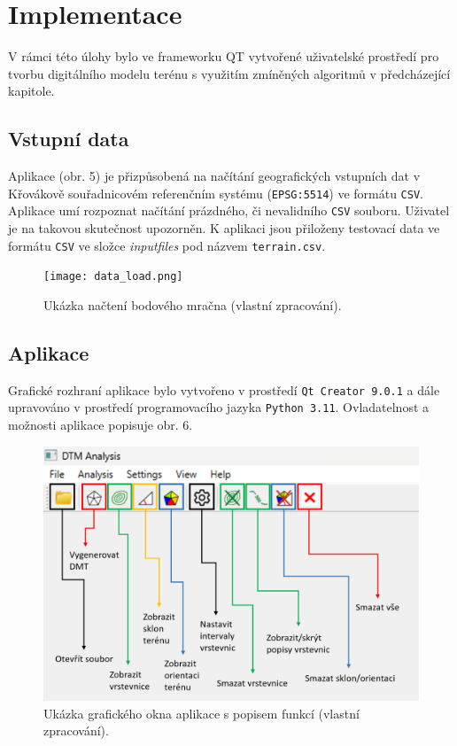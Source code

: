 \chapter*{Implementace}

\par V rámci této úlohy bylo ve frameworku QT vytvořené uživatelské prostředí pro tvorbu digitálního modelu terénu s využitím zmíněných algoritmů v předcházející kapitole.

\section*{Vstupní data}
\par Aplikace (obr. 5) je přizpůsobená na načítání geografických vstupních dat v Křovákově souřadnicovém referenčním systému (\verb|EPSG:5514|) ve formátu \verb|CSV|. Aplikace umí rozpoznat načítání prázdného, či nevalidního \verb|CSV| souboru. Uživatel je na takovou skutečnost upozorněn. K aplikaci jsou přiloženy testovací data ve formátu \verb|CSV| ve složce \emph{input\textunderscore files} pod názvem \verb|terrain.csv|.
\begin{figure}[H]
\centering
\texttt{[image: data\_load.png]}
    \caption{Ukázka načtení bodového mračna (vlastní zpracování).}
\end{figure}
\section*{Aplikace}
\par Grafické rozhraní aplikace bylo vytvořeno v prostředí \verb|Qt Creator 9.0.1| a dále upravováno v prostředí programovacího jazyka \verb|Python 3.11|. Ovladatelnost a možnosti aplikace popisuje obr. 6.

\begin{figure}[H]
\centering
\includegraphics[width=14cm]{images/showcase.png}
    \caption{Ukázka grafického okna aplikace s popisem funkcí (vlastní zpracování).}
\end{figure}

